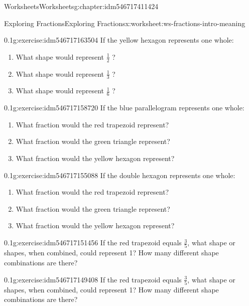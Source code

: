 \documentclass[twoside,11pt,]{book}
\begin{document}
\begin{chapterptx}{Worksheets}{}{Worksheets}{}{}{g:chapter:idm546717411424}
\begin{worksheet-section-numberless}{Exploring Fractions}{}{Exploring Fractions}{}{}{x:worksheet:ws-fractions-intro-meaning}
\begin{introduction}{}
\end{introduction}%
\begin{divisionexercise}{4}{}{0.1}{g:exercise:idm546717163504}%
If the yellow hexagon represents one whole:%
%
\begin{enumerate}[label=(\alph*)]
\item{}What shape would represent \(\frac{1}{2} \) ?%
\item{}What shape would represent \(\frac{1}{3} \) ?%
\item{}What shape would represent \(\frac{1}{6} \) ?%
\end{enumerate}
\end{divisionexercise}%
\begin{divisionexercise}{5}{}{0.1}{g:exercise:idm546717158720}%
If the blue parallelogram represents one whole:%
%
\begin{enumerate}[label=(\alph*)]
\item{}What fraction would the red trapezoid represent?%
\item{}What fraction would the green triangle represent?%
\item{}What fraction would the yellow hexagon represent?%
\end{enumerate}
\end{divisionexercise}%
\begin{divisionexercise}{6}{}{0.1}{g:exercise:idm546717155088}%
If the double hexagon represents one whole:%
%
\begin{enumerate}[label=(\alph*)]
\item{}What fraction would the red trapezoid represent?%
\item{}What fraction would the green triangle represent?%
\item{}What fraction would the yellow hexagon represent?%
\end{enumerate}
\end{divisionexercise}%
\begin{divisionexercise}{7}{}{0.1}{g:exercise:idm546717151456}%
If the red trapezoid equals \(\frac{3}{5} \), what shape or shapes, when combined, could represent 1?  How many different shape combinations are there?%
\end{divisionexercise}%
\begin{divisionexercise}{8}{}{0.1}{g:exercise:idm546717149408}%
If the red trapezoid equals \(\frac{3}{5} \), what shape or shapes, when combined, could represent 1?  How many different shape combinations are there?%
\end{divisionexercise}%

\end{worksheet-section-numberless}
\end{chapterptx}
\end{document}
